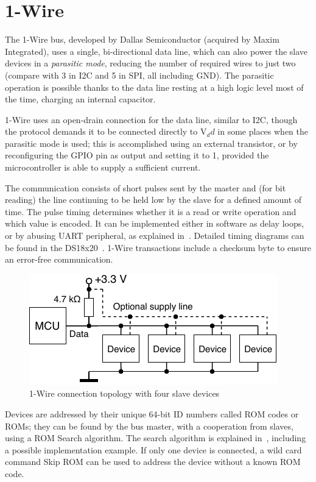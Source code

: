 \section{1-Wire} \label{sec:theory-1wire}

The 1-Wire bus, developed by Dallas Semiconductor (acquired by Maxim Integrated), uses a single, bi-directional data line, which can also power the slave devices in a \textit{parasitic mode}, reducing the number of required wires to just two (compare with 3 in \gls{I2C} and 5 in \gls{SPI}, all including \gls{GND}). The parasitic operation is possible thanks to the data line resting at a high logic level most of the time, charging an internal capacitor.

1-Wire uses an open-drain connection for the data line, similar to \gls{I2C}, though the protocol demands it to be connected directly to V$_dd$ in some places when the parasitic mode is used; this is accomplished using an external transistor, or by reconfiguring the GPIO pin as output and setting it to 1, provided the microcontroller is able to supply a sufficient current.

The communication consists of short pulses sent by the master and (for bit reading) the line continuing to be held low by the slave for a defined amount of time. The pulse timing determines whether it is a read or write operation and which value is encoded. It can be implemented either in software as delay loops, or by abusing \gls{UART} peripheral, as explained in~\cite{ow-uart}. Detailed timing diagrams can be found in the DS18x20~\cite{ow-datasheet}. 1-Wire transactions include a checksum byte to ensure an error-free communication.

\begin{figure}[h]
	\centering
	\includegraphics[scale=1] {img/1w-connection.pdf}
	\caption{\label{fig:1w-topology}1-Wire connection topology with four slave devices}
\end{figure}

Devices are addressed by their unique 64-bit ID numbers called ROM codes or ROMs; they can be found by the bus master, with a cooperation from slaves, using a ROM Search algorithm. The search algorithm is explained in~\cite{ow-appnote}, including a possible implementation example. If only one device is connected, a wild card command Skip ROM can be used to address the device without a known ROM code.

